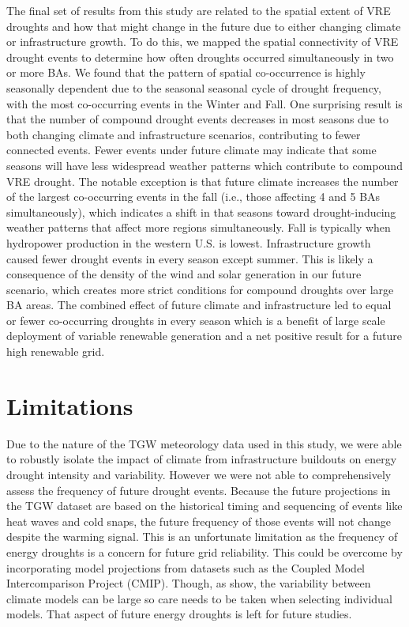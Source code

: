 \documentclass{agujournal2019}
\begin{document}
The final set of results from this study are related to the spatial extent of VRE droughts and how that might change in the future due to either changing climate or infrastructure growth. To do this, we mapped the spatial connectivity of VRE drought events to determine how often droughts occurred simultaneously in two or more BAs. We found that the pattern of spatial co-occurrence is highly seasonally dependent due to the seasonal seasonal cycle of drought frequency, with the most co-occurring events in the Winter and Fall. One surprising result is that the number of compound drought events decreases in most seasons due to both changing climate and infrastructure scenarios, contributing to fewer connected events. Fewer events under future climate may indicate that some seasons will have less widespread weather patterns which contribute to compound VRE drought. The notable exception is that future climate increases the number of the largest co-occurring events in the fall (i.e., those affecting 4 and 5 BAs simultaneously), which indicates a shift in that seasons toward drought-inducing weather patterns that affect more regions simultaneously. Fall is typically when hydropower production in the western U.S. is lowest. Infrastructure growth caused fewer drought events in every season except summer. This is likely a consequence of the density of the wind and solar generation in our future scenario, which creates more strict conditions for compound droughts over large BA areas. The combined effect of future climate and infrastructure led to equal or fewer co-occurring droughts in every season which is a benefit of large scale deployment of variable renewable generation and a net positive result for a future high renewable grid.


\section{Limitations}

Due to the nature of the TGW meteorology data used in this study, we were able to robustly isolate the impact of climate from infrastructure buildouts on energy drought intensity and variability. However we were not able to comprehensively assess the frequency of future drought events. Because the future projections in the TGW dataset are based on the historical timing and sequencing of events like heat waves and cold snaps, the future frequency of those events will not change despite the warming signal. This is an unfortunate limitation as the frequency of energy droughts is a concern for future grid reliability. This could be overcome by incorporating model projections from datasets such as the Coupled Model Intercomparison Project (CMIP). Though, as  show, the variability between climate models can be large so care needs to be taken when selecting individual models. That aspect of future energy droughts is left for future studies.
\end{document}
